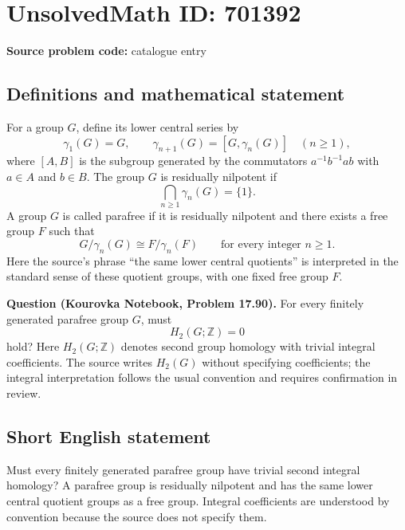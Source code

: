 \documentclass[11pt]{article}
\newcommand{\Z}{\mathbb{Z}}
\begin{document}
\section*{UnsolvedMath ID: 701392}
\textbf{Source problem code:} catalogue entry
\subsection{Definitions and mathematical statement}
For a group \(G\), define its lower central series by
\[
\gamma_1(G)=G,\qquad \gamma_{n+1}(G)=[G,\gamma_n(G)]\quad(n\geq 1),
\]
where \([A,B]\) is the subgroup generated by the commutators \(a^{-1}b^{-1}ab\) with \(a\in A\) and \(b\in B\). The group \(G\) is residually nilpotent if
\[
\bigcap_{n\geq 1}\gamma_n(G)=\{1\}.
\]
A group \(G\) is called parafree if it is residually nilpotent and there exists a free group \(F\) such that
\[
G/\gamma_n(G)\cong F/\gamma_n(F)\qquad\text{for every integer }n\geq 1.
\]
Here the source's phrase ``the same lower central quotients'' is interpreted in the standard sense of these quotient groups, with one fixed free group \(F\).

\textbf{Question (Kourovka Notebook, Problem 17.90).} For every finitely generated parafree group \(G\), must
\[
H_2(G;\Z)=0
\]
hold? Here \(H_2(G;\Z)\) denotes second group homology with trivial integral coefficients. The source writes \(H_2(G)\) without specifying coefficients; the integral interpretation follows the usual convention and requires confirmation in review.
\subsection{Short English statement}
Must every finitely generated parafree group have trivial second integral homology? A parafree group is residually nilpotent and has the same lower central quotient groups as a free group. Integral coefficients are understood by convention because the source does not specify them.
\end{document}
